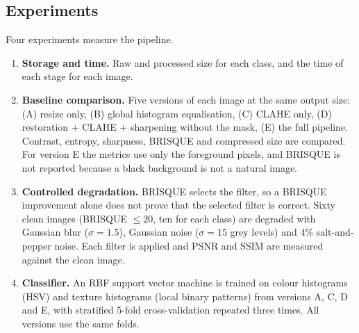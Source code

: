 \subsection{Experiments}
\label{sec:experiments}
Four experiments measure the pipeline.
\begin{enumerate}[nosep]
\item \textbf{Storage and time.} Raw and processed size for each class, and the time of each stage for each image.
\item \textbf{Baseline comparison.} Five versions of each image at the same output size: (A) resize only, (B) global histogram equalisation, (C) CLAHE only, (D) restoration + CLAHE + sharpening without the mask, (E) the full pipeline. Contrast, entropy, sharpness, BRISQUE and compressed size are compared. For version E the metrics use only the foreground pixels, and BRISQUE is not reported because a black background is not a natural image.
\item \textbf{Controlled degradation.} BRISQUE selects the filter, so a BRISQUE improvement alone does not prove that the selected filter is correct. Sixty clean images (BRISQUE $\le 20$, ten for each class) are degraded with Gaussian blur ($\sigma = 1.5$), Gaussian noise ($\sigma = 15$ grey levels) and 4\% salt-and-pepper noise. Each filter is applied and PSNR and SSIM are measured against the clean image.
\item \textbf{Classifier.} An RBF support vector machine is trained on colour histograms (HSV) and texture histograms (local binary patterns) from versions A, C, D and E, with stratified 5-fold cross-validation repeated three times. All versions use the same folds.
\end{enumerate}
